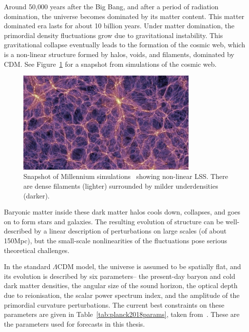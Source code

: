 Around 50,000 years after the Big Bang, and after a period of radiation domination, the universe becomes dominated by its matter content. This matter dominated era lasts for about 10 billion years. Under matter domination, the primordial density fluctuations grow due to gravitational instability. This gravitational collapse eventually leads to the formation of the cosmic web, which is a non-linear structure formed by halos, voids, and filaments, dominated by CDM. See Figure~\ref{fig:millennium} for a snapshot from simulations of the cosmic web. 

\begin{figure}[ht!]
	\centering
	\includegraphics[width=0.8\textwidth]{fig/Millennium.png}
	\caption{Snapshot of Millennium simulations~\cite{Springel:2005nw} showing non-linear LSS. There are dense filaments (lighter) surrounded by milder underdensities (darker). }
	\label{fig:millennium}
\end{figure}

Baryonic matter inside these dark matter halos cools down, collapses, and goes on to form stars and galaxies. The resulting evolution of structure can be well-described by a linear description of perturbations on large scales (of about 150Mpc), but the small-scale nonlinearities of the fluctuations pose serious theoretical challenges.

In the standard $\Lambda$CDM model, the universe is assumed to be spatially flat, and its evolution is described by six parameters-- the present-day baryon and cold dark matter densities, the angular size of the sound horizon, the optical depth due to reionisation, the scalar power spectrum index, and the amplitude of the primordial curvature perturbations. The current best constraints on these parameters are given in Table~\ref{tab:planck2018params}, taken from~\cite{Aghanim:2018eyx}. These are the parameters used for forecasts in this thesis.

